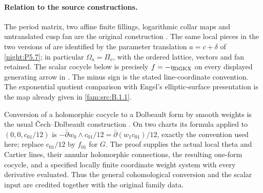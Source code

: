\paragraph{Relation to the source constructions.}
The period matrix, two affine finite fillings, logarithmic collar maps
and untranslated cusp fan are the original construction
\cite[Sections~3--6]{AC2026}.  The same local pieces in the two
versions of \cite{DuEtAl2026v1,DuEtAl2026v2} are identified by the
parameter translation $a=c+\delta$ of \cref{night:P5.7}; in particular
$\Omega_a=\Pi_c$, with the ordered lattice, vectors and fan retained.
The scalar cocycle below is precisely $f=-\eta_{\rm DGKX}$ on every
displayed generating arrow in
\cite[Section~6.4, the scalar cocycle preceding Lemma~6.14]{DuEtAl2026v1}.
The minus sign is the stated line-coordinate convention.  The
exponential quotient comparison with Engel's elliptic-surface
presentation is the map already given in
\cref{fam:src:B.1.1}.

Conversion of a holomorphic cocycle to a Dolbeault form by smooth
weights is the usual \v Cech--Dolbeault construction
\cite[Theorem~3.1 and proof, p.~10]{AbateBracciSuwaTovena2010Atiyah}.
On two charts its formula applied to $(0,0,c_{01}/12)$ is
$-\bar\partial w_0\wedge c_{01}/12
=\bar\partial(w_1c_{01})/12$, exactly the convention used here;
replace $c_{01}/12$ by $f_{01}$ for $G$.
The proof supplies the actual local theta and Cartier lines, their
annular holomorphic connections, the resulting one-form cocycle,
and a specified locally finite coordinate weight system with every
derivative evaluated.  Thus the general cohomological conversion and
the scalar input are credited together with the original family data.
